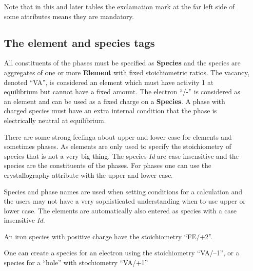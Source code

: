 \documentclass{article}
\begin{document}
Note that in this and later tables the exclamation mark at the far
left side of some attributes means they are mandatory.

\subsection{The element and species tags}\label{sec:elements}

All constituents of the phases must be specified as {\bf Species} and
the species are aggregates of one or more {\bf Element} with fixed
stoichiometric ratios.  The vacancy, denoted ``VA'', is considered an
element which must have activity 1 at equilibrium but cannot have a
fixed amount.  The electron ``/-'' is considered as an element and can
be used as a fixed charge on a {\bf Species}.  A phase with charged
species must have an extra internal condition that the phase is
electrically neutral at equilibrium.

There are some strong feelinga about upper and lower case for elements
and sometimes phases.  As elements are only used to specify the
stoichiometry of species that is not a very big thing.  The species
{\em Id} are case insensitive and the species are the constituents of
the phases.  For phases one can use the crystallography attribute with
the upper and lower case.

Species and phase names are used when setting conditions for a
calculation and the users may not have a very sophisticated
understanding when to use upper or lower case.  The elements are
automatically also entered as species with a case insensitive {\em Id}.

An iron species with positive charge have the stoichiometry ``FE/+2''.

One can create a species for an electron using the stoichiometry
``VA/--1'', or a species for a ``hole'' with stochiometry ``VA/+1''
\end{document}
